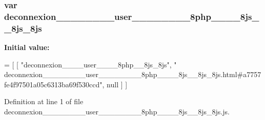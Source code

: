 \subsubsection[{deconnexion\+\_\+\+\_\+\+\_\+\+\_\+\+\_\+\+\_\+\+\_\+\+\_\+user\+\_\+\+\_\+\+\_\+\+\_\+\+\_\+\+\_\+\+\_\+\+\_\+8php\+\_\+\+\_\+\+\_\+\+\_\+8js\+\_\+\+\_\+8js\+\_\+8js}]{\setlength{\rightskip}{0pt plus 5cm}var deconnexion\+\_\+\+\_\+\+\_\+\+\_\+\+\_\+\+\_\+\+\_\+\+\_\+user\+\_\+\+\_\+\+\_\+\+\_\+\+\_\+\+\_\+\+\_\+\+\_\+8php\+\_\+\+\_\+\+\_\+\+\_\+8js\+\_\+\+\_\+8js\+\_\+8js}\label{deconnexion________________user________________8php________8js____8js__8js_8js_ab25e4d911884b998d2bd725abe2b17a7}
{\bfseries Initial value\+:}
\begin{DoxyCode}
=
[
    [ \textcolor{stringliteral}{"deconnexion\_\_\_\_user\_\_\_\_8php\_\_8js\_8js"}, \textcolor{stringliteral}{"
      deconnexion\_\_\_\_\_\_\_\_user\_\_\_\_\_\_\_\_8php\_\_\_\_8js\_\_8js\_8js.html#a7757fe4f97501a05c6313ba69f530ccd"}, null ]
]
\end{DoxyCode}


Definition at line 1 of file deconnexion\+\_\+\+\_\+\+\_\+\+\_\+\+\_\+\+\_\+\+\_\+\+\_\+user\+\_\+\+\_\+\+\_\+\+\_\+\+\_\+\+\_\+\+\_\+\+\_\+8php\+\_\+\+\_\+\+\_\+\+\_\+8js\+\_\+\+\_\+8js\+\_\+8js.\+js.

